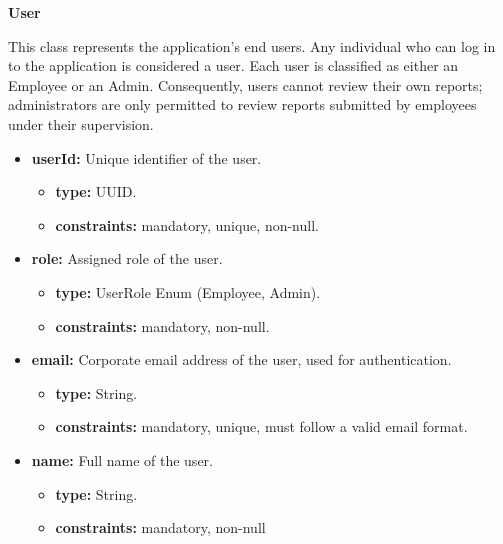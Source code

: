 
\textbf{User}

This class represents the application's end users. Any individual who can log in to the application is considered a user. Each user is classified as either an Employee or an Admin. Consequently, users cannot review their own reports; administrators are only permitted to review reports submitted by employees under their supervision.

\begin{itemize} [leftmargin=0.75cm, noitemsep, label=\textbullet]

    \item \textbf{userId:} Unique identifier of the user. 
    
    \begin{itemize} [leftmargin=0.75cm, noitemsep, label=$\circ$]

        \item \textbf{type:} UUID.

        \item \textbf{constraints:} mandatory, unique, non-null.

    \end{itemize}

    \item \textbf{role:} Assigned role of the user.
    
    \begin{itemize} [leftmargin=0.75cm, noitemsep, label=$\circ$]

        \item \textbf{type:} UserRole Enum (Employee, Admin).

        \item \textbf{constraints:} mandatory, non-null.

    \end{itemize}

    \item \textbf{email:} Corporate email address of the user, used for authentication.
    
    \begin{itemize} [leftmargin=0.75cm, noitemsep, label=$\circ$]

        \item \textbf{type:} String.

        \item \textbf{constraints:} mandatory, unique, must follow a valid email format.

    \end{itemize}

    \item \textbf{name:} Full name of the user.
    
    \begin{itemize} [leftmargin=0.75cm, noitemsep, label=$\circ$]

        \item \textbf{type:} String.

        \item \textbf{constraints:} mandatory, non-null
        
    \end{itemize}

\end{itemize}